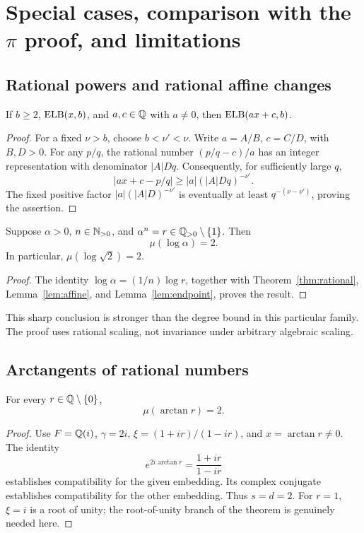 \section{Special cases, comparison with the \texorpdfstring{\(\pi\)}{pi}
proof, and limitations}\label{sec:consequences}

\subsection{Rational powers and rational affine changes}

\begin{lemma}\label{lem:affine}
If \(b\ge2\), \(\operatorname{ELB}(x,b)\), and \(a,c\in\mathbb Q\) with \(a\ne0\),
then \(\operatorname{ELB}(ax+c,b)\).
\end{lemma}
\begin{proof}
For a fixed \(\nu>b\), choose \(b<\nu'<\nu\).
Write \(a=A/B\), \(c=C/D\), with \(B,D>0\).
For any \(p/q\), the rational number \((p/q-c)/a\) has an integer
representation with denominator \(|A|Dq\).
Consequently, for sufficiently large \(q\),
\[
 |ax+c-p/q|\ge |a|(|A|Dq)^{-\nu'}.
\]
The fixed positive factor
\(|a|(|A|D)^{-\nu'}\) is eventually at least
\(q^{-(\nu-\nu')}\), proving the assertion.
\end{proof}

\begin{corollary}\label{cor:rational-powers}
Suppose \(\alpha>0\), \(n\in\mathbb N_{>0}\), and
\(\alpha^n=r\in\mathbb Q_{>0}\setminus\{1\}\).
Then
\[
 \mu(\log\alpha)=2.
\]
In particular,
\(\mu(\log\sqrt2)=2\).
\end{corollary}
\begin{proof}
The identity \(\log\alpha=(1/n)\log r\), together with
Theorem~\ref{thm:rational}, Lemma~\ref{lem:affine}, and
Lemma~\ref{lem:endpoint}, proves the result.
\end{proof}

This sharp conclusion is stronger than the degree bound in this
particular family. The proof uses rational scaling, not invariance
under arbitrary algebraic scaling.

\subsection{Arctangents of rational numbers}

\begin{corollary}\label{cor:arctangent}
For every \(r\in\mathbb Q\setminus\{0\}\),
\[
 \mu(\arctan r)=2.
\]
\end{corollary}
\begin{proof}
Use \(F=\mathbb Q(i)\), \(\gamma=2i\),
\(\xi=(1+ir)/(1-ir)\), and \(x=\arctan r\ne0\).
The identity
\[
 e^{2i\arctan r}=\frac{1+ir}{1-ir}
\]
establishes compatibility for the given embedding. Its complex
conjugate establishes compatibility for the other embedding.
Thus \(s=d=2\).
For \(r=1\), \(\xi=i\) is a root of unity; the root-of-unity
branch of the theorem is genuinely needed here.
\end{proof}

